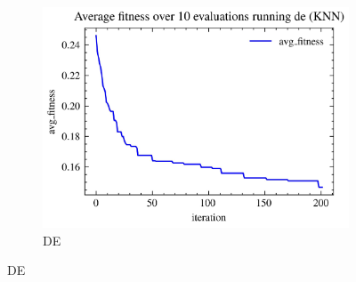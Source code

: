 \begin{figure}[H]
\begin{subfigure}[b]{0.3\textwidth}
        \includegraphics[width=\textwidth]{imagenes/binary_knn_fitness/KNN_fitness_over_10_evaluations_de_binary_breast-cancer.jpg}
        \caption{DE}
        \label{fig:sub6}
    \end{subfigure}


\end{figure}
